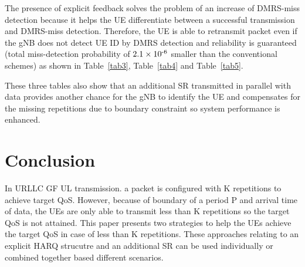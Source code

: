 \documentclass[conference]{IEEEtran}
\begin{document}
The presence of explicit feedback solves the problem of an increase of DMRS-miss detection because it helps the UE differentiate between a successful transmission and DMRS-miss detection. Therefore, the UE is able to retransmit packet even if the gNB does not detect UE ID by DMRS detection and reliability is guaranteed (total miss-detection probability of $2.1\times10\textsuperscript{-6}$ smaller than the conventional schemes) as shown in Table~\ref{tab3}, Table~\ref{tab4} and Table~\ref{tab5}.

These three tables also show that an additional SR transmitted in parallel with data provides another chance for the gNB to identify the UE and compensates for the missing repetitions due to boundary constraint so system performance is enhanced. 

\section{Conclusion}\label{V}

In URLLC GF UL transmission. a packet is configured with K repetitions to achieve target QoS. However, because of boundary of a period P and arrival time of data, the UEs are only able to transmit less than K repetitions so the target QoS is not attained. This paper presents two strategies to help the UEs achieve the target QoS in case of less than K repetitions. These approaches relating to an explicit HARQ strucutre and an additional SR can be used individually or combined together based different scenarios.
\end{document}

